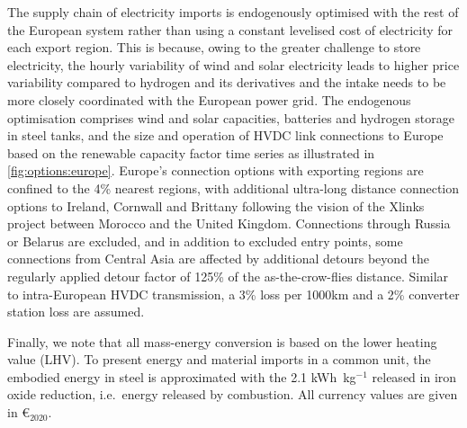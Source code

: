 The supply chain of electricity imports is endogenously optimised with the rest
of the European system rather than using a constant levelised cost of
electricity for each export region. This is because, owing to the greater
challenge to store electricity, the hourly variability of wind and solar
electricity leads to higher price variability compared to hydrogen and its
derivatives and the intake needs to be more closely coordinated with the
European power grid. The endogenous optimisation comprises wind and solar
capacities, batteries and hydrogen storage in steel tanks, and the size and
operation of HVDC link connections to Europe based on the renewable capacity
factor time series as illustrated in \cref{fig:options:europe}. Europe's
connection options with exporting regions are confined to the 4\% nearest
regions, with additional ultra-long distance connection options to Ireland,
Cornwall and Brittany following the vision of the Xlinks project between Morocco
and the United Kingdom.\cite{xlinksMoroccoUKPowerProject2023} Connections through
Russia or Belarus are excluded, and in addition to excluded entry points, some
connections from Central Asia are affected by additional detours beyond the
regularly applied detour factor of 125\% of the as-the-crow-flies distance.
Similar to intra-European HVDC transmission, a 3\% loss per 1000km and a 2\%
converter station loss are assumed.

\vspace{1em}

Finally, we note that all mass-energy conversion is based on the lower heating
value (LHV). To present energy and material imports in a common unit, the
embodied energy in steel is approximated with the 2.1 kWh~kg$^{-1}$ released in
iron oxide reduction, i.e.~energy released by
combustion.\cite{kuhnIronRecyclable2022} All currency values are given in
\euro{}$_{2020}$.
